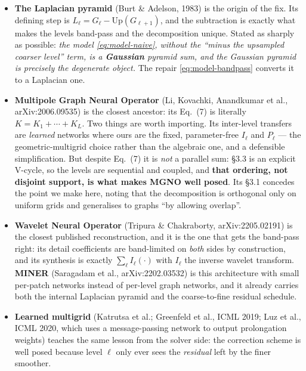 \documentclass[11pt,a4paper]{article}
\begin{document}
\begin{itemize}[leftmargin=1.4em,itemsep=3pt]
\item \textbf{The Laplacian pyramid} (Burt \& Adelson, 1983) is the origin of the fix. Its
defining step is $L_\ell = G_\ell - \mathrm{Up}(G_{\ell+1})$, and the subtraction is exactly
what makes the levels band-pass and the decomposition unique. Stated as sharply as possible:
\emph{the model \eqref{eq:model-naive}, without the ``minus the upsampled coarser level''
term, is a \textbf{Gaussian} pyramid sum, and the Gaussian pyramid is precisely the
degenerate object.} The repair \eqref{eq:model-bandpass} converts it to a Laplacian one.

\item \textbf{Multipole Graph Neural Operator} (Li, Kovachki, Anandkumar et al.,
arXiv:2006.09535) is the closest ancestor: its Eq.~(7) is literally $K = K_1 + \cdots + K_L$.
Two things are worth importing. Its inter-level transfers are \emph{learned} networks where
ours are the fixed, parameter-free $I_\ell$ and $P_\ell$ --- the geometric-multigrid choice
rather than the algebraic one, and a defensible simplification. But despite Eq.~(7) it is
\emph{not} a parallel sum: \S3.3 is an explicit V-cycle, so the levels are sequential and
coupled, and \textbf{that ordering, not disjoint support, is what makes MGNO well posed}.
Its \S3.1 concedes the point we make here, noting that the decomposition is orthogonal only
on uniform grids and generalises to graphs ``by allowing overlap''.

\item \textbf{Wavelet Neural Operator} (Tripura \& Chakraborty, arXiv:2205.02191) is the
closest published reconstruction, and it is the one that gets the band-pass right: its detail
coefficients are band-limited on \emph{both} sides by construction, and its synthesis is
exactly $\sum_\ell I_\ell(\cdot)$ with $I_\ell$ the inverse wavelet transform.
\textbf{MINER} (Saragadam et al., arXiv:2202.03532) is this architecture with small per-patch
networks instead of per-level graph networks, and it already carries both the internal
Laplacian pyramid and the coarse-to-fine residual schedule.

\item \textbf{Learned multigrid} (Katrutsa et al.; Greenfeld et al., ICML 2019; Luz et al.,
ICML 2020, which uses a message-passing network to output prolongation weights) teaches the
same lesson from the solver side: the correction scheme is well posed because level $\ell$
only ever sees the \emph{residual} left by the finer smoother.


\end{itemize}
\end{document}
